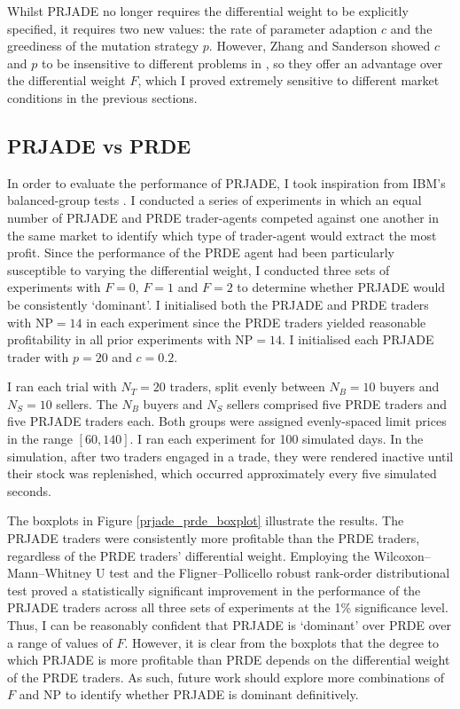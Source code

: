 \documentclass[a4paper,twoside]{article}
\begin{document}
Whilst PRJADE no longer requires the differential weight to be explicitly specified, it requires two new values: the rate of parameter adaption $c$ and the greediness of the mutation strategy $p$.
However, Zhang and Sanderson showed $c$ and $p$ to be insensitive to different problems in \cite{ZhangSanderson}, so they offer an advantage over the differential weight $F$, which I proved extremely sensitive to different market conditions in the previous sections.

\subsection{PRJADE vs PRDE}

In order to evaluate the performance of PRJADE, I took inspiration from IBM's balanced-group tests \cite{TesauroDas}.
I conducted a series of experiments in which an equal number of PRJADE and PRDE trader-agents competed against one another in the same market to identify which type of trader-agent would extract the most profit.
Since the performance of the PRDE agent had been particularly susceptible to varying the differential weight, I conducted three sets of experiments with $F=0$, $F=1$ and $F=2$ to determine whether PRJADE would be consistently `dominant'.
I initialised both the PRJADE and PRDE traders with $\mathrm{NP}=14$ in each experiment since the PRDE traders yielded reasonable profitability in all prior experiments with $\mathrm{NP}=14$.
I initialised each PRJADE trader with $p=20$ and $c=0.2$.

I ran each trial with $N_T=20$ traders, split evenly between $N_B=10$ buyers and $N_S=10$ sellers.
The $N_B$ buyers and $N_S$ sellers comprised five PRDE traders and five PRJADE traders each.
Both groups were assigned evenly-spaced limit prices in the range $[60,140]$.
I ran each experiment for 100 simulated days.
In the simulation, after two traders engaged in a trade, they were rendered inactive until their stock was replenished, which occurred approximately every five simulated seconds.

The boxplots in Figure \ref{prjade_prde_boxplot} illustrate the results.
The PRJADE traders were consistently more profitable than the PRDE traders, regardless of the PRDE traders' differential weight.
Employing the Wilcoxon--Mann--Whitney U test and the Fligner--Pollicello robust rank-order distributional test proved a statistically significant improvement in the performance of the PRJADE traders across all three sets of experiments at the 1\% significance level.
Thus, I can be reasonably confident that PRJADE is `dominant' over PRDE over a range of values of $F$.
However, it is clear from the boxplots that the degree to which PRJADE is more profitable than PRDE depends on the differential weight of the PRDE traders.
As such, future work should explore more combinations of $F$ and $\mathrm{NP}$ to identify whether PRJADE is dominant definitively.
\end{document}
